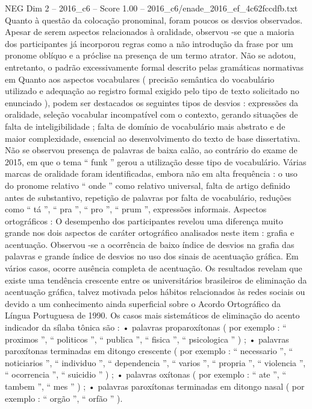 \begin{textsample}{NEG Dim 2 – 2016\_c6 – Score 1.00 – 2016\_c6/enade\_2016\_ef\_4c62fccdfb.txt}
Quanto à questão da colocação pronominal, foram poucos os desvios observados.
Apesar de serem aspectos relacionados à oralidade, observou -se que a maioria dos participantes já incorporou regras como a não introdução da frase por um pronome oblíquo e a próclise na presença de um termo atrator.
Não se adotou, entretanto, o padrão excessivamente formal descrito pelas gramáticas normativas em Quanto aos aspectos vocabulares ( precisão semântica do vocabulário utilizado e adequação ao registro formal exigido pelo tipo de texto solicitado no enunciado ), podem ser destacados os seguintes tipos de desvios : expressões da oralidade, seleção vocabular incompatível com o contexto, gerando situações de falta de inteligibilidade ; falta de domínio de vocabulário mais abstrato e de maior complexidade, essencial ao desenvolvimento do texto de base dissertativa.
Não se observou presença de palavras de baixa calão, ao contrário do exame de 2015, em que o tema “ funk ” gerou a utilização desse tipo de vocabulário.
Várias marcas de oralidade foram identificadas, embora não em alta frequência : o uso do pronome relativo “ onde ” como relativo universal, falta de artigo definido antes de substantivo, repetição de palavras por falta de vocabulário, reduções como “ tá ”, “ pra ”, “ pro ”, “ prum ”, expressões informais.
Aspectos ortográficos : O desempenho dos participantes revelou uma diferença muito grande nos dois aspectos de caráter ortográfico analisados neste item : grafia e acentuação.
Observou -se a ocorrência de baixo índice de desvios na grafia das palavras e grande índice de desvios no uso dos sinais de acentuação gráfica.
Em vários casos, ocorre ausência completa de acentuação.
Os resultados revelam que existe uma tendência crescente entre os universitários brasileiros de eliminação da acentuação gráfica, talvez motivada pelos hábitos relacionados às redes sociais ou devido a um conhecimento ainda superficial sobre o Acordo Ortográfico da Língua Portuguesa de 1990.
Os casos mais sistemáticos de eliminação do acento indicador da sílaba tônica são : • palavras proparoxítonas ( por exemplo : “ proximos ”, “ politicos ”, “ publica ”, “ fisica ”, “ psicologica ” ) ; • palavras paroxítonas terminadas em ditongo crescente ( por exemplo : “ necessario ”, “ noticiarios ”, “ individuo ”, “ dependencia ”, “ varios ”, “ propria ”, “ violencia ”, “ ocorrencia ”, “ suicidio ” ) ; • palavras oxítonas ( por exemplo : “ ate ”, “ tambem ”, “ mes ” ) ; • palavras paroxítonas terminadas em ditongo nasal ( por exemplo : “ orgão ”, “ orfão ” ).

\end{textsample}
